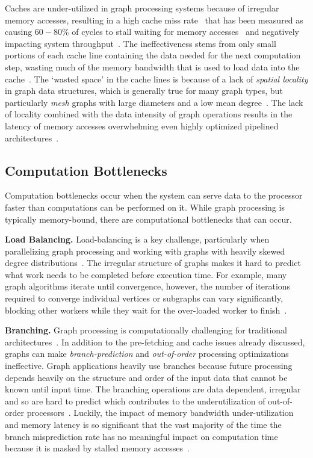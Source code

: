Caches are under-utilized in graph processing systems because of irregular memory accesses, resulting in a high cache miss rate~\cite{Song2016} that has been measured as causing $60-80\%$ of cycles to stall waiting for memory accesses~\cite{Zhang2017} and negatively impacting system throughput~\cite{Beamer2015}.
The ineffectiveness stems from only small portions of each cache line containing the data needed for the next computation step, wasting much of the memory bandwidth that is used to load data into the cache~\cite{Ham2016, Mukkara2018, Aananthakrishnan2020}. 
The `wasted space' in the cache lines is because of a lack of \textit{spatial locality} in graph data structures, which is generally true for many graph types, but particularly \textit{mesh} graphs with large diameters and a low mean degree~\cite{Oguntebi2016, Ham2016}.
The lack of locality combined with the data intensity of graph operations results in the latency of memory accesses overwhelming even highly optimized pipelined architectures~\cite{Dysart2016}.

\subsection{Computation Bottlenecks}
Computation bottlenecks occur when the system can serve data to the processor faster than computations can be performed on it. 
While graph processing is typically memory-bound, there are computational bottlenecks that can occur. 

\textbf{Load Balancing.}
Load-balancing is a key challenge, particularly when parallelizing graph processing and working with graphs with heavily skewed degree distributions~\cite{Aananthakrishnan2020}.
The irregular structure of graphs makes it hard to predict what work needs to be completed before execution time.
For example, many graph algorithms iterate until convergence, however, the number of iterations required to converge individual vertices or subgraphs can vary significantly, blocking other workers while they wait for the over-loaded worker to finish~\cite{Ozdal2017}.

\textbf{Branching.}
Graph processing is computationally challenging for traditional architectures~\cite{Dadu2021}.
In addition to the pre-fetching and cache issues already discussed, graphs can make \textit{branch-prediction} and \textit{out-of-order} processing optimizations ineffective. 
Graph applications heavily use branches because future processing depends heavily on the structure and order of the input data that cannot be known until input time.
The branching operations are data dependent, irregular and so are hard to predict which contributes to the underutilization of out-of-order processors~\cite{Aananthakrishnan2020}.
Luckily, the impact of memory bandwidth under-utilization and memory latency is so significant that the vast majority of the time the branch misprediction rate has no meaningful impact on computation time because it is masked by stalled memory accesses~\cite{Beamer2015}.

